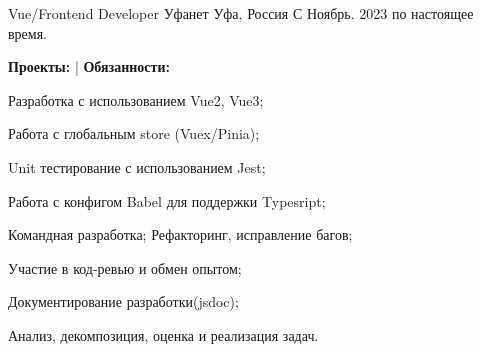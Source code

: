 

\begin{cventries}

  \cventry
    {Vue/Frontend Developer} %
    {Уфанет} %
    {Уфа, Россия} %
    {С Ноябрь. 2023 по настоящее время.} %
    {
      \begin{cvitems} %
        \newline \textbf{Проекты:}
         |
        \newline \textbf{Обязанности:}
        \item {Разработка с использованием Vue2, Vue3;}
        \item {Работа с глобальным store (Vuex/Pinia);}
        \item {Unit тестирование  с использованием Jest;}
        \item {Работа с конфигом Babel для поддержки Typesript;}
        \item {Командная разработка; Рефакторинг, исправление багов;}
        \item {Участие в код-ревью и обмен опытом;}
        \item {Документирование разработки(jsdoc);}
        \item {Анализ, декомпозиция, оценка и реализация задач.}
      \end{cvitems}
    }


\end{cventries}
